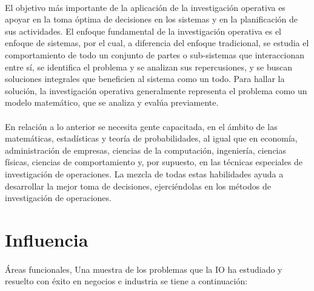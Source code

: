 \documentclass[12pt, a4paper,spanish]{article}
\begin{document}
		\paragraph{}
		El objetivo más importante de la aplicación de la investigación operativa es apoyar en la toma óptima de decisiones en los sistemas y en la planificación de sus actividades. El enfoque fundamental de la investigación operativa es el enfoque de sistemas, por el cual, a diferencia del enfoque tradicional, se estudia el comportamiento de todo un conjunto de partes o sub-sistemas que interaccionan entre sí, se identifica el problema y se analizan sus repercusiones, y se buscan soluciones integrales que beneficien al sistema como un todo. Para hallar la solución, la investigación operativa generalmente representa el problema como un modelo matemático, que se analiza y evalúa previamente.\cite{wikipedia_IO}

		\paragraph{}
		En relación a lo anterior se necesita gente capacitada, en el ámbito de las matemáticas, estadísticas y teoría de probabilidades, al igual que en economía, administración de empresas, ciencias de la computación, ingeniería, ciencias físicas, ciencias de comportamiento y, por supuesto, en las técnicas especiales de investigación de operaciones. La mezcla de todas estas habilidades ayuda a desarrollar la mejor toma de decisiones, ejerciéndolas en los métodos de investigación de operaciones.\cite{gestiopolis_IO}



	\section{Influencia}
		\paragraph{}
		Áreas funcionales, Una muestra de los problemas que la IO ha estudiado y resuelto con éxito en negocios e industria se tiene a continuación:
\end{document}
